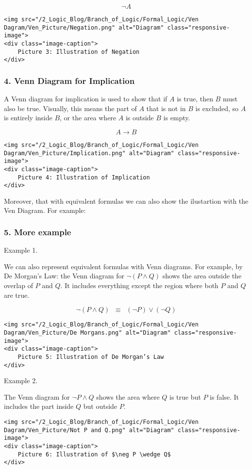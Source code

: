 \[
\neg A
\]

\begin{verbatim}
<img src="/2_Logic_Blog/Branch_of_Logic/Formal_Logic/Ven Dagram/Ven_Picture/Negation.png" alt="Diagram" class="responsive-image">
<div class="image-caption">
    Picture 3: Illustration of Negation
</div>
\end{verbatim}

\subsubsection{4. Venn Diagram for
Implication}\label{venn-diagram-for-implication}

A Venn diagram for implication is used to show that if \(A\) is true,
then \(B\) must also be true. Visually, this means the part of \(A\)
that is not in \(B\) is excluded, so \(A\) is entirely inside \(B\), or
the area where \(A\) is outside \(B\) is empty.

\[
A \to B
\]

\begin{verbatim}
<img src="/2_Logic_Blog/Branch_of_Logic/Formal_Logic/Ven Dagram/Ven_Picture/Implication.png" alt="Diagram" class="responsive-image">
<div class="image-caption">
    Picture 4: Illustration of Implication
</div>
\end{verbatim}

Moreover, that with equivalent formulas we can also show the ilustartion
with the Ven Diagram. For example:

\subsubsection{5. More example}\label{more-example}

Example 1.

We can also represent equivalent formulas with Venn diagrams. For
example, by De Morgan's Law: the Venn diagram for \(\neg (P \wedge Q)\)
shows the area outside the overlap of \(P\) and \(Q\). It includes
everything except the region where both \(P\) and \(Q\) are true.

\[
\neg (P \wedge Q) \;\;\equiv\;\; (\neg P) \vee (\neg Q)
\]

\begin{verbatim}
<img src="/2_Logic_Blog/Branch_of_Logic/Formal_Logic/Ven Dagram/Ven_Picture/De Morgans.png" alt="Diagram" class="responsive-image">
<div class="image-caption">
    Picture 5: Illustration of De Morgan’s Law
</div>
\end{verbatim}

Example 2.

The Venn diagram for \(\neg P \wedge Q\) shows the area where \(Q\) is
true but \(P\) is false. It includes the part inside \(Q\) but outside
\(P\).

\begin{verbatim}
<img src="/2_Logic_Blog/Branch_of_Logic/Formal_Logic/Ven Dagram/Ven_Picture/Not P and Q.png" alt="Diagram" class="responsive-image">
<div class="image-caption">
    Picture 6: Illustration of $\neg P \wedge Q$
</div>
\end{verbatim}
